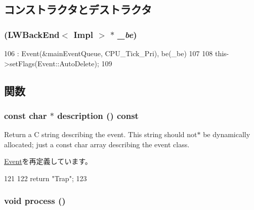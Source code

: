 \subsection{コンストラクタとデストラクタ}
\hypertarget{classLWBackEnd_1_1TrapEvent_a4caaa81ac3c9c998182937e381339316}{
\subsubsection[{TrapEvent}]{ ({\bf LWBackEnd}$<$ Impl $>$ $\ast$ {\em \_\-be})}}
\label{classLWBackEnd_1_1TrapEvent_a4caaa81ac3c9c998182937e381339316}



\begin{DoxyCode}
106     : Event(&mainEventQueue, CPU_Tick_Pri), be(_be)
107 {
108     this->setFlags(Event::AutoDelete);
109 }
\end{DoxyCode}


\subsection{関数}
\hypertarget{classLWBackEnd_1_1TrapEvent_a5a14fe478e2393ff51f02e9b7be27e00}{
\subsubsection[{description}]{\setlength{\rightskip}{0pt plus 5cm}const char $\ast$ description () const}}
\label{classLWBackEnd_1_1TrapEvent_a5a14fe478e2393ff51f02e9b7be27e00}
Return a C string describing the event. This string should not$\ast$ be dynamically allocated; just a const char array describing the event class. 

\hyperlink{classEvent_a130ddddf003422b413e2e891b1b80e8f}{Event}を再定義しています。


\begin{DoxyCode}
121 {
122     return "Trap";
123 }
\end{DoxyCode}
\hypertarget{classLWBackEnd_1_1TrapEvent_a2e9c5136d19b1a95fc427e0852deab5c}{
\subsubsection[{process}]{\setlength{\rightskip}{0pt plus 5cm}void process ()}}
\label{classLWBackEnd_1_1TrapEvent_a2e9c5136d19b1a95fc427e0852deab5c}



